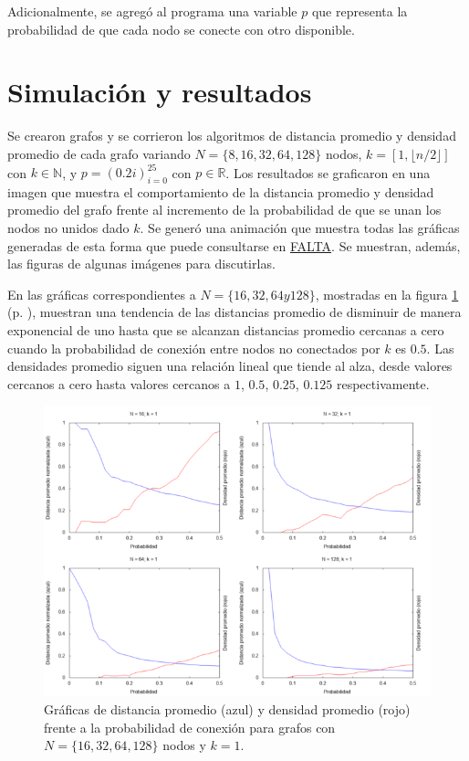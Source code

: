 \documentclass{article}
\begin{document}
  Adicionalmente, se agregó al programa una variable $p$ que representa la probabilidad de que cada nodo se conecte con otro disponible.

  \section{Simulación y resultados}

  Se crearon grafos y se corrieron los algoritmos de distancia promedio y densidad promedio de cada grafo variando $N = \{ 8, 16, 32, 64, 128 \}$ nodos, $k = [1, \lfloor n / 2 \rfloor]$ con $k \in \mathbb{N}$, y $p = (0.2i)_{i= 0}^{25}$ con $p \in \mathbb{R}$. Los resultados se graficaron en una imagen que muestra el comportamiento de la distancia promedio y densidad promedio del grafo frente al incremento de la probabilidad de que se unan los nodos no unidos dado $k$. Se generó una animación que muestra todas las gráficas generadas de esta forma que puede consultarse en \url{FALTA}. Se muestran, además, las figuras de algunas imágenes para discutirlas.

  En las gráficas correspondientes a $N = \{ 16, 32, 64 y 128 \} $, mostradas en la figura \ref{ejemplok1} (p. \pageref{ejemplok1}), muestran una tendencia de las distancias promedio de disminuir de manera exponencial de uno hasta que se alcanzan distancias promedio cercanas a cero cuando la probabilidad de conexión entre nodos no conectados por $k$ es $0.5$. Las densidades promedio siguen una relación lineal que tiende al alza, desde valores cercanos a cero hasta valores cercanos a $1$, $0.5$, $0.25$, $0.125$ respectivamente.

  \begin{figure}[h]
    \includegraphics[width=1\textwidth]{ejemplok1}
    \centering
    \caption{Gráficas de distancia promedio (azul) y densidad promedio (rojo) frente a la probabilidad de conexión para grafos con $N = \{ 16, 32, 64, 128 \} $ nodos y $k = 1$.}
    \label{ejemplok1}
  \end{figure}
\end{document}
